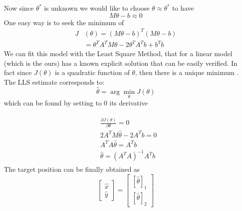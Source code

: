 \documentclass[12pt,twoside]{report}
\begin{document}
Now since $\theta^*$ is unknown we would like to choose $\theta\approx\theta^*$ to have 
\begin{equation}
    M\theta-b\approx0
\end{equation}
One easy way is to seek the minimum of 
\begin{align}
    J&(\theta)=(M\theta - b)^T(M\theta - b)\\
    &=\theta^TA^TM\theta-2\theta^TA^Tb+b^Tb
\end{align}
We can fit this model with the Least Square Method, that for a linear model (which is the ours) has a known explicit solution \cite{10.5555/1557273} that can be easily verified. In fact since $J(\theta)$ is a quadratic function of $\theta$, then there is a unique minimum \cite{Ortega1987,rzk}. The LLS estimate corresponds to:
\begin{equation}
    \hat{\theta}=\arg \min_\theta J(\theta)
\end{equation}
which can be found by setting to $0$ its derivative
    
\begin{align}
\begin{split}
&\frac{\partial J(\theta)}{\partial \theta}=0\\
    &2A^TM\hat{\theta}-2A^Tb=0\\
    &A^TA\hat{\theta}=A^Tb\\
    &\hat{\theta}=(A^TA)^{-1}A^Tb
\end{split}
\end{align}
The target position can be finally obtained as 
\begin{equation}
\begin{bmatrix}
    \hat{x}\\
    \hat{y}
\end{bmatrix}=
\begin{bmatrix}
    [\hat{\theta}]_1\\
    [\hat{\theta}]_2
\end{bmatrix}
\end{equation}
\clearpage
\end{document}
